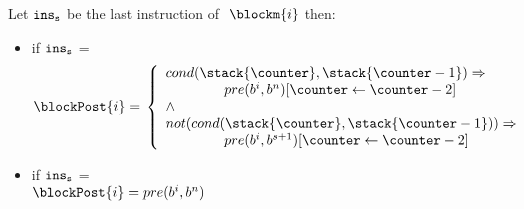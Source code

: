 \begin{defn}\label{post}
 Let $\tt{ins}_s$ be the last instruction of $\ \blockm{i} $ then:
 \begin{itemize} 
 
 \item if  $\tt{ins}_s$ =   \\
$$
\blockPost{i} =  \\
\left\{
\begin{array}{l}
cond( \stack{\counter}, \stack{\counter - 1} )   \Rightarrow \\
\phantom{ \counter }   pre(b^{i}, b^{n})[ \counter \leftarrow \counter -2 ]  \\
\wedge \\
 not ( cond( \stack{\counter}, \stack{\counter - 1} )  )   \Rightarrow \\
\phantom{ \counter}    pre(b^{i}, b^{s+1})[ \counter \leftarrow \counter -2 ]      \\                             
\end{array}
\right.
$$
\item if  $\tt{ins}_s$ =   \\ 
$\blockPost{i} =  pre(b^{i}, b^{n})$ \\


\end{itemize}
\end{defn}
